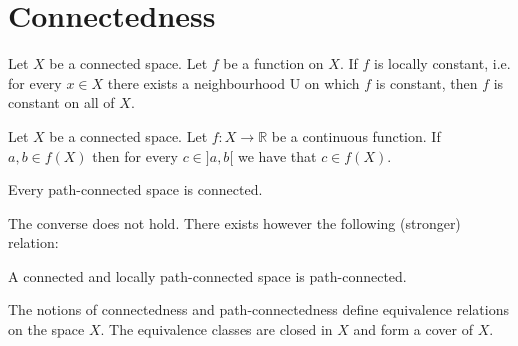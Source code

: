 \section{Connectedness}
	
	
	\begin{property}
		Let $X$ be a connected space. Let $f$ be a function on $X$. If $f$ is locally constant, i.e. for every $x\in X$ there exists a neighbourhood U on which $f$ is constant, then $f$ is constant on all of $X$.
	\end{property}
	
	\begin{theorem}\label{topology:theorem:intermediate_value_theorem}
		Let $X$ be a connected space. Let $f:X\rightarrow\mathbb{R}$ be a continuous function. If $a, b\in f(X)$ then for every $c\in ]a, b[$ we have that $c\in f(X)$.
	\end{theorem}

	
	\begin{property}
		Every path-connected space is connected.
	\end{property}
	The converse does not hold. There exists however the following (stronger) relation:
	\begin{property}
		A connected and locally path-connected space is path-connected.
	\end{property}
	
	\begin{remark}
		The notions of connectedness and path-connectedness define equivalence relations on the space $X$. The equivalence classes are closed in $X$ and form a cover of $X$.
	\end{remark}

